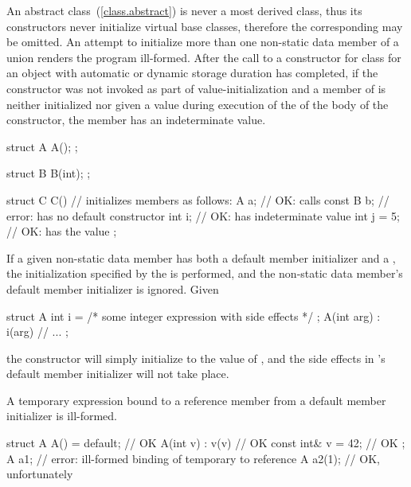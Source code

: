 \enternote An abstract class~(\ref{class.abstract}) is never a most derived
class, thus its constructors never initialize virtual base classes, therefore the
corresponding  may be omitted. \exitnote
An attempt to initialize more than one non-static data member of a union renders the
program ill-formed.
%
%
\enternote
After the call to a constructor for class
for an object with automatic or dynamic storage duration
has completed, if
the constructor was not invoked as part of value-initialization and
a member of
is neither initialized nor
given a value
during execution of the  of the body of the constructor,
the member has an indeterminate value.
\exitnote
\enterexample
\begin{codeblock}
struct A {
  A();
};

struct B {
  B(int);
};

struct C {
  C() { }               // initializes members as follows:
  A a;                    // OK: calls 
  const B b;              // error:  has no default constructor
  int i;                  // OK:  has indeterminate value
  int j = 5;              // OK:  has the value 
};
\end{codeblock}
\exitexample

\pnum
If a given non-static data member has both a default member initializer
and a , the initialization specified by the
 is performed, and the non-static data member's 
default member initializer is ignored.
\enterexample Given
\begin{codeblock}
struct A {
  int i = /* some integer expression with side effects */ ;
  A(int arg) : i(arg) { }
  // ...
};
\end{codeblock}

the  constructor will simply initialize  to the value of
, and the
%
side effects in 's default member initializer 
will not take place.
\exitexample

\pnum
A temporary expression bound to a reference member from a
default member initializer is ill-formed.
\enterexample
\begin{codeblock}
struct A {
  A() = default;          // OK
  A(int v) : v(v) { }     // OK
  const int& v = 42;      // OK
};
A a1;                     // error: ill-formed binding of temporary to reference
A a2(1);                  // OK, unfortunately
\end{codeblock}
\exitexample

